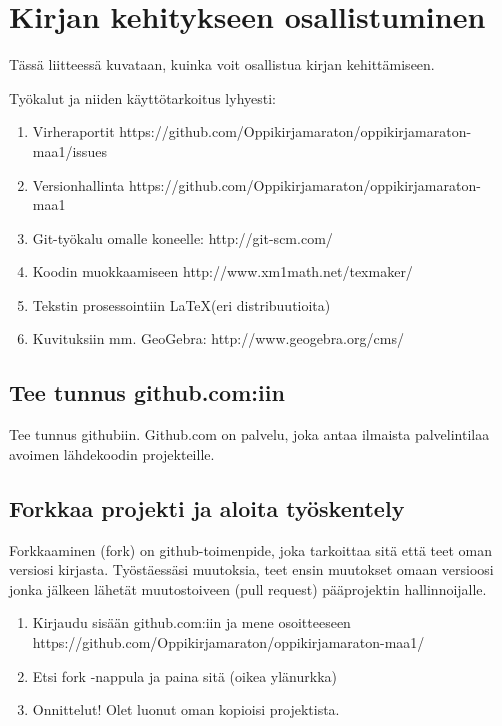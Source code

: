 \chapter{Kirjan kehitykseen osallistuminen}

Tässä liitteessä kuvataan, kuinka voit osallistua kirjan kehittämiseen.

Työkalut ja niiden käyttötarkoitus lyhyesti:

\begin{enumerate}

\item Virheraportit https://github.com/Oppikirjamaraton/oppikirjamaraton-maa1/issues
\item Versionhallinta https://github.com/Oppikirjamaraton/oppikirjamaraton-maa1
\item Git-työkalu omalle koneelle: http://git-scm.com/
\item Koodin muokkaamiseen http://www.xm1math.net/texmaker/
\item Tekstin prosessointiin \LaTeX (eri distribuutioita)
\item Kuvituksiin mm. GeoGebra: http://www.geogebra.org/cms/

\end{enumerate}

\section{Tee tunnus github.com:iin}

Tee tunnus githubiin. Github.com on palvelu, joka antaa ilmaista palvelintilaa avoimen lähdekoodin projekteille.


\section{Forkkaa projekti ja aloita työskentely}

Forkkaaminen (fork) on github-toimenpide, joka tarkoittaa sitä että teet oman versiosi kirjasta. Työstäessäsi muutoksia, teet ensin muutokset omaan versioosi jonka jälkeen lähetät muutostoiveen (pull request) pääprojektin hallinnoijalle.

\begin{enumerate}

\item Kirjaudu sisään github.com:iin ja mene osoitteeseen https://github.com/Oppikirjamaraton/oppikirjamaraton-maa1/
\item Etsi fork -nappula ja paina sitä (oikea ylänurkka)
\item Onnittelut! Olet luonut oman kopioisi projektista. 

\end{enumerate}

